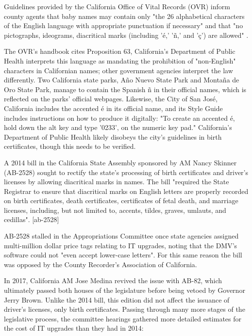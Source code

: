 \parencite{acs-lang-states} Guidelines provided by the California Office of
Vital Records (OVR) inform county agents that baby names may contain only "the
26 alphabetical characters of the English language with appropriate punctuation
if necessary" and that "no pictographs, ideograms, diacritical marks (including
'é,' 'ñ,' and 'ç') are allowed" \parencite{larson11}.

The OVR's handbook cites Proposition 63, 
California's Department of Public Health interprets this language as mandating
the prohibition of "non-English" characters in Californian names; other
government agencies interpret the law differently. Two California state parks,
Año Nuevo State Park and Montaña de Oro State Park, manage to contain the
Spanish ñ in their official names, which is reflected on the parks' official
webpages. \parencite{año-nuevo} \parencite{montaña-de-oro} Likewise, the City of
San José, California includes the accented é in its official name, and its Style
Guide includes instructions on how to produce it digitally: "To create an
accented é, hold down the alt key and type '0233'‚ on the numeric key pad."
\textcite{san-josé} California's Department of Public Health likely disobeys the
city's guidelines in birth certificates, though this needs to be verified.

A 2014 bill in the California State Assembly sponsored by AM Nancy Skinner
(AB-2528) sought to rectify the state's processing of birth certificates and
driver's licenses by allowing diacritical marks in names. The bill "required the
State Registrar to ensure that diacritical marks on English letters are properly
recorded on birth certificates, death certificates, certificates of fetal death,
and marriage licenses, including, but not limited to, accents, tildes, graves,
umlauts, and cedillas". [ab-2528]

AB-2528 stalled in the Appropriations Committee once state agencies assigned
multi-million dollar price tags relating to IT upgrades, noting that the DMV's
software could not "even accept lower-case letters". For this same reason the
bill was opposed by the County Recorder's Association of California.

In 2017, California AM Jose Medina revived the issue with AB-82, which
ultimately passed both houses of the legislature before being vetoed by Governor
Jerry Brown. Unlike the 2014 bill, this edition did not affect the issuance of
driver's licenses, only birth certificates. Passing through many more stages of
the legislative process, the committee hearings gathered more detailed estimates
for the cost of IT upgrades than they had in 2014:

